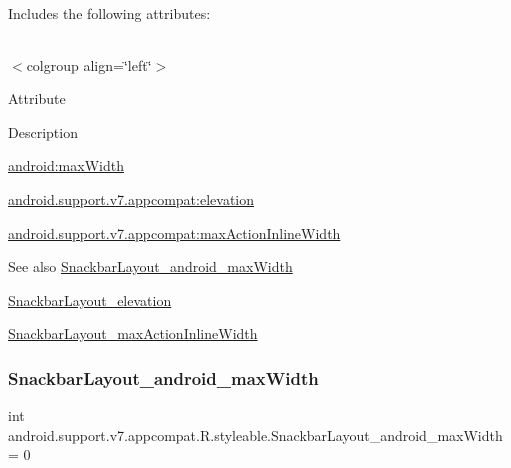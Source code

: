Includes the following attributes\+:

\tabulinesep=1mm
\begin{longtabu} spread 0pt [c]{*{0}{|X[-1]}|}
\hline
\end{longtabu}
$<$colgroup align=\char`\"{}left\char`\"{}$>$ 

Attribute

Description 

{\ttfamily \hyperlink{classandroid_1_1support_1_1v7_1_1appcompat_1_1R_1_1styleable_a350ec521c59036c206387ba98d7224e8}{android\+:max\+Width}}

{\ttfamily \hyperlink{classandroid_1_1support_1_1v7_1_1appcompat_1_1R_1_1styleable_abb92d0272ef9198076ff5b305902bc7c}{android.\+support.\+v7.\+appcompat\+:elevation}}

{\ttfamily \hyperlink{classandroid_1_1support_1_1v7_1_1appcompat_1_1R_1_1styleable_a2759504e9ac635133f732820f34b2035}{android.\+support.\+v7.\+appcompat\+:max\+Action\+Inline\+Width}}

\begin{DoxySeeAlso}{See also}
\hyperlink{classandroid_1_1support_1_1v7_1_1appcompat_1_1R_1_1styleable_a350ec521c59036c206387ba98d7224e8}{Snackbar\+Layout\+\_\+android\+\_\+max\+Width} 

\hyperlink{classandroid_1_1support_1_1v7_1_1appcompat_1_1R_1_1styleable_abb92d0272ef9198076ff5b305902bc7c}{Snackbar\+Layout\+\_\+elevation} 

\hyperlink{classandroid_1_1support_1_1v7_1_1appcompat_1_1R_1_1styleable_a2759504e9ac635133f732820f34b2035}{Snackbar\+Layout\+\_\+max\+Action\+Inline\+Width} 
\end{DoxySeeAlso}
\mbox{\label{classandroid_1_1support_1_1v7_1_1appcompat_1_1R_1_1styleable_a350ec521c59036c206387ba98d7224e8}} 
\subsubsection{\texorpdfstring{Snackbar\+Layout\+\_\+android\+\_\+max\+Width}{SnackbarLayout\_android\_maxWidth}}
{\footnotesize\ttfamily int android.\+support.\+v7.\+appcompat.\+R.\+styleable.\+Snackbar\+Layout\+\_\+android\+\_\+max\+Width = 0\hspace{0.3cm}{\ttfamily [static]}}

